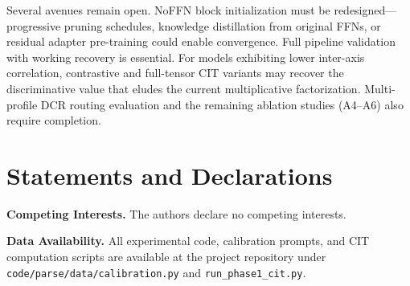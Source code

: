 \documentclass[twocolumn]{article}
\begin{document}
Several avenues remain open. NoFFN block initialization must be redesigned---progressive pruning schedules, knowledge distillation from original FFNs, or residual adapter pre-training could enable convergence. Full pipeline validation with working recovery is essential. For models exhibiting lower inter-axis correlation, contrastive and full-tensor CIT variants may recover the discriminative value that eludes the current multiplicative factorization. Multi-profile DCR routing evaluation and the remaining ablation studies (A4--A6) also require completion.

\section*{Statements and Declarations}

\textbf{Competing Interests.} The authors declare no competing interests.

\textbf{Data Availability.} All experimental code, calibration prompts, and CIT computation scripts are available at the project repository under \texttt{code/parse/data/calibration.py} and \texttt{run\_phase1\_cit.py}.


\end{document}

